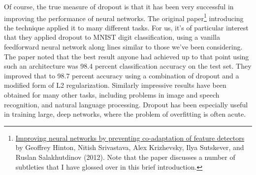 \documentclass[a4paper,twoside,10pt]{book}
\begin{document}
Of course, the true measure of dropout is that it has been very successful in improving the performance of neural networks. The original paper\footnote{\href{http://arxiv.org/pdf/1207.0580.pdf}{Improving neural networks by preventing co-adaptation of feature detectors} by Geoffrey Hinton, Nitish Srivastava, Alex Krizhevsky, Ilya Sutskever, and Ruslan Salakhutdinov (2012). Note that the paper discusses a number of subtleties that I have glossed over in this brief introduction.} introducing the technique applied it to many different tasks. For us, it's of particular interest that they applied dropout to MNIST digit classification, using a vanilla feedforward neural network along lines similar to those we've been considering. The paper noted that the best result anyone had achieved up to that point using such an architecture was 98.4 percent classification accuracy on the test set. They improved that to 98.7 percent accuracy using a combination of dropout and a modified form of L2 regularization. Similarly impressive results have been obtained for many other tasks, including problems in image and speech recognition, and natural language processing. Dropout has been especially useful in training large, deep networks, where the problem of overfitting is often acute.
\end{document}
